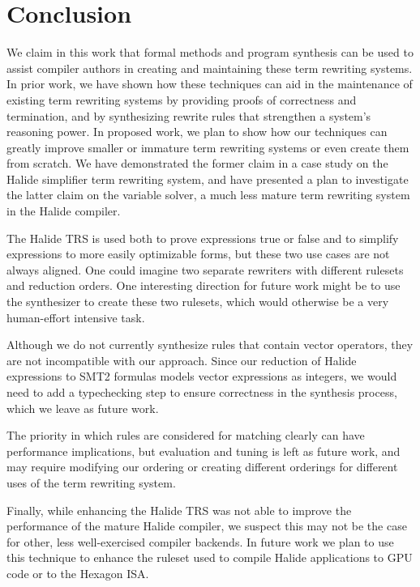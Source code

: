 \section{Conclusion}
We claim in this work that formal methods and program synthesis can be used to assist compiler authors in creating and maintaining these term rewriting systems. In prior work, we have shown how these techniques can aid in the maintenance of existing term rewriting systems by providing proofs of correctness and termination, and by synthesizing rewrite rules that strengthen a system's reasoning power. In proposed work, we plan to show how our techniques can greatly improve smaller or immature term rewriting systems or even create them from scratch. We have demonstrated the former claim in a case study on the Halide simplifier term rewriting system, and have presented a plan to investigate the latter claim on the variable solver, a much less mature term rewriting system in the Halide compiler.

The Halide TRS is used both to prove expressions true or false and to
simplify expressions to more easily optimizable forms, but these two use cases
are not always aligned. One could imagine two separate rewriters with
different rulesets and reduction orders. One interesting direction for future
work might be to use the synthesizer to create these two rulesets, which would
otherwise be a very human-effort intensive task.

Although we do not currently synthesize rules that contain vector operators,
they are not incompatible with our approach. Since our reduction of Halide
expressions to SMT2 formulas models vector expressions as integers, we would need
to add a typechecking step to ensure correctness in the synthesis process, which
we leave as future work.

The priority in which rules are considered for matching clearly can have
performance implications, but evaluation and tuning is left as future work, and
may require modifying our ordering or creating different orderings for different
uses of the term rewriting system.

Finally, while enhancing the Halide TRS was not able to improve the performance of the mature Halide compiler, we suspect this may not be the case for other, less well-exercised compiler backends. In future work we plan to use this technique to enhance the ruleset used to compile Halide applications to GPU code or to the Hexagon ISA.
